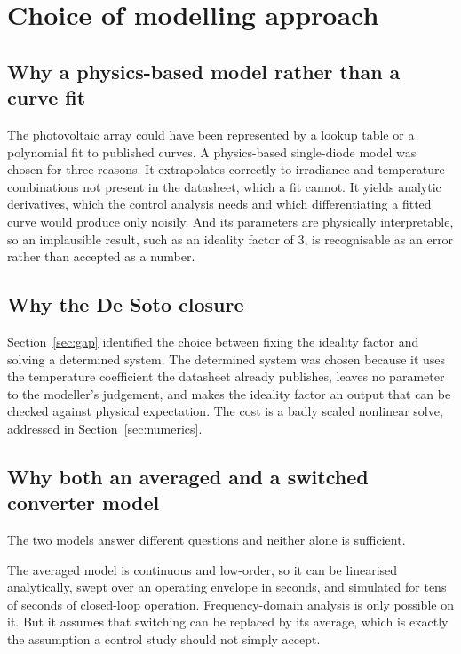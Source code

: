 \section{Choice of modelling approach}

\subsection{Why a physics-based model rather than a curve fit}

The photovoltaic array could have been represented by a lookup table or a
polynomial fit to published curves. A physics-based single-diode model was
chosen for three reasons. It extrapolates correctly to irradiance and
temperature combinations not present in the datasheet, which a fit cannot. It
yields analytic derivatives, which the control analysis needs and which
differentiating a fitted curve would produce only noisily. And its parameters
are physically interpretable, so an implausible result, such as an ideality
factor of \num{3}, is recognisable as an error rather than accepted as a number.

\subsection{Why the De Soto closure}

Section~\ref{sec:gap} identified the choice between fixing the ideality factor
and solving a determined system. The determined system was chosen because it
uses the temperature coefficient the datasheet already publishes, leaves no
parameter to the modeller's judgement, and makes the ideality factor an output
that can be checked against physical expectation. The cost is a badly scaled
nonlinear solve, addressed in Section~\ref{sec:numerics}.

\subsection{Why both an averaged and a switched converter model}

The two models answer different questions and neither alone is sufficient.

The averaged model is continuous and low-order, so it can be linearised
analytically, swept over an operating envelope in seconds, and simulated for
tens of seconds of closed-loop operation. Frequency-domain analysis is only
possible on it. But it assumes that switching can be replaced by its average,
which is exactly the assumption a control study should not simply accept.

